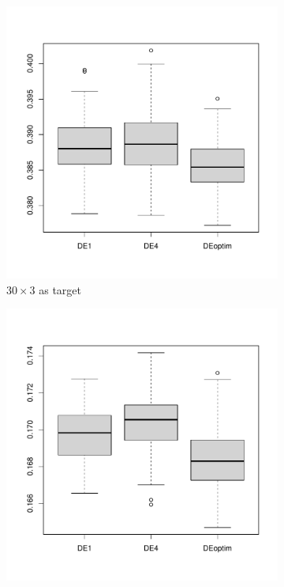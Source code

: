 \documentclass [PhD] {package/uclathes}
\begin{document}
\begin{figure}[!h]
     \centering
     \begin{subfigure}[b]{0.3\textwidth}
         \centering
         \includegraphics[width=\textwidth]{chapters/DE/pdfs/boxplots2}
         \caption{$30\times 3$ as target}
     \end{subfigure}
     \hfill
     \begin{subfigure}[b]{0.3\textwidth}
         \centering
         \includegraphics[width=\textwidth]{chapters/DE/pdfs/boxplots3}

\end{subfigure}
\end{figure}
\end{document}
